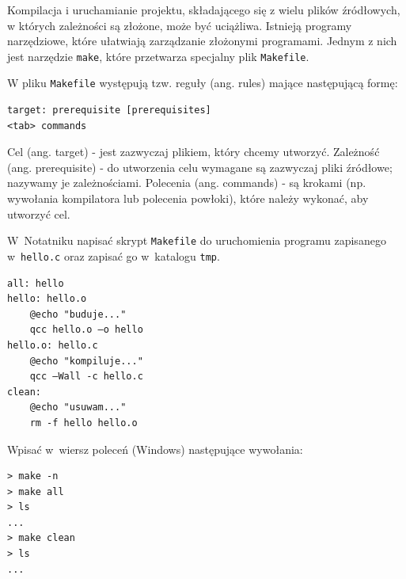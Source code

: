 Kompilacja i uruchamianie projektu, składającego się z wielu plików źródłowych, w których zależności są złożone, może być uciążliwa. Istnieją programy narzędziowe, które ułatwiają zarządzanie złożonymi programami. Jednym z nich jest narzędzie \lstinline[style=MyBashStyle]{make}, które przetwarza specjalny plik \lstinline[style=MyBashStyle]{Makefile}.

W pliku \lstinline[style=MyBashStyle]{Makefile} występują tzw. reguły (ang. rules) mające następującą formę:

\begin{lstlisting}[style=MyBashStyle]
target: prerequisite [prerequisites]
<tab> commands
\end{lstlisting}

Cel (ang. target) - jest zazwyczaj plikiem, który chcemy utworzyć. Zależność (ang. prerequisite) - do utworzenia celu wymagane są zazwyczaj pliki źródłowe; nazywamy je zależnościami. Polecenia (ang. commands) - są krokami (np. wywołania kompilatora lub polecenia powłoki), które należy wykonać, aby utworzyć cel.

\begin{example}
W~Notatniku napisać skrypt \lstinline[style=MyBashStyle]{Makefile} do uruchomienia programu zapisanego w~\lstinline[style=MyBashStyle]{hello.c} oraz zapisać go w~katalogu \lstinline[style=MyBashStyle]{tmp}.

\begin{lstlisting}[style=MyBashStyle,caption=Pierwszy plik Makefile]
all: hello
hello: hello.o
	@echo "buduje..."
	qcc hello.o –o hello
hello.o: hello.c
	@echo "kompiluje..."
	qcc –Wall -c hello.c
clean:
	@echo "usuwam..."
	rm -f hello hello.o
\end{lstlisting}

Wpisać w~wiersz poleceń (Windows) następujące wywołania:

\begin{lstlisting}[style=MyBashStyle,caption=Pierwszy plik Makefile]
> make -n
> make all
> ls
...
> make clean
> ls
...
\end{lstlisting}

\end{example}


